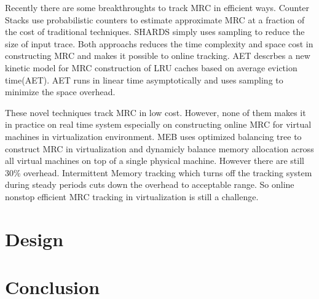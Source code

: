 \documentclass[10pt,twocolumn]{article}
\begin{document}
Recently there are some breakthroughts to track MRC in efficient ways. Counter Stacks\cite{Wires2014Characterizing} use probabilistic counters to estimate approximate MRC at a fraction of the cost of traditional techniques. SHARDS\cite{shards} simply uses sampling to reduce the size of input trace. Both approachs reduces the time complexity and space cost in constructing MRC and makes it possible to online tracking. AET\cite{aet} descrbes a new kinetic model for MRC construction of LRU caches based on average eviction time(AET). AET runs in linear time asymptotically and uses sampling to minimize the space overhead.

These novel techniques track MRC in low cost. However, none of them makes it in practice on real time system especially on constructing online MRC for virtual machines in virtualization environment. MEB\cite{Wang2016Dynamic} uses optimized balancing tree to construct MRC in virtualization and dynamicly balance memory allocation across all virtual machines on top of a single physical machine. However there are still 30\% overhead. Intermittent Memory tracking which turns off the tracking system during steady periods cuts down the overhead to acceptable range. So online nonstop efficient MRC tracking in virtualization is still a challenge.


\section{Design}


\section{Conclusion}





\end{document}
